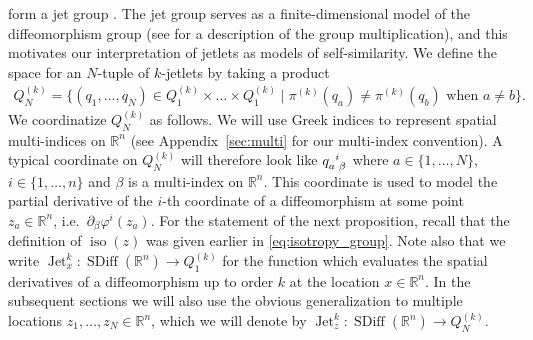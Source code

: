 \documentclass[12pt]{amsart}
\newcommand{\R}{\ensuremath{\mathbb{R}}}
\DeclareMathOperator{\SDiff}{SDiff}
\DeclareMathOperator{\Jet}{Jet}
\DeclareMathOperator{\iso}{iso}
\begin{document}
  form a jet group \cite{JacobsRatiuDesbrun2013}.
  The jet group serves as a finite-dimensional model of the diffeomorphism group (see \cite[Chapter 4]{KMS99} for a description of the group multiplication),
  and this motivates our interpretation of jetlets as models of self-similarity.
  We define the space for an $N$-tuple of $k$-jetlets by taking a product
  \begin{align*}
    Q^{(k)}_N = \{ (q_1,\dots, q_N) \in Q_1^{(k)} \times \dots \times Q_1^{(k)}
    \mid \pi^{(k)}(q_a) \neq \pi^{(k)}(q_b) \text{ when } a \neq b \}.
  \end{align*}
  We coordinatize $Q^{(k)}_N$ as follows.
  We will use Greek indices to represent spatial
  multi-indices on $\R^n$ (see Appendix~\ref{sec:multi} for our multi-index convention).
  A typical coordinate on $Q^{(k)}_N$ will therefore look
  like $q\indices{_a^i_\beta}$ where $a \in \{1,\dots,N\}$, $i \in \{ 1 , \dots, n \}$
  and $\beta$ is a multi-index on $\R^n$.
  This coordinate is used to model the partial derivative of the $i$-th coordinate
  of a diffeomorphism at some point $z_a \in \R^n$, i.e.\ $\partial_\beta \varphi^i(z_a)$.
  For the statement of the next proposition, recall that the definition  of $\iso(z)$ was given earlier in \eqref{eq:isotropy_group}. Note also that we write $\Jet^k_x: \SDiff(\R^n) \to Q_1^{(k)}$ for
    the function which evaluates the spatial derivatives
    of a diffeomorphism up to order $k$ at the location $x \in \R^n$. In the subsequent sections we will also use the obvious generalization to multiple locations $z_1, \ldots, z_N \in \R^n$, which we will denote by $\Jet^k_z : \SDiff(\R^n) \to Q_N^{(k)}$.  
\end{document}
